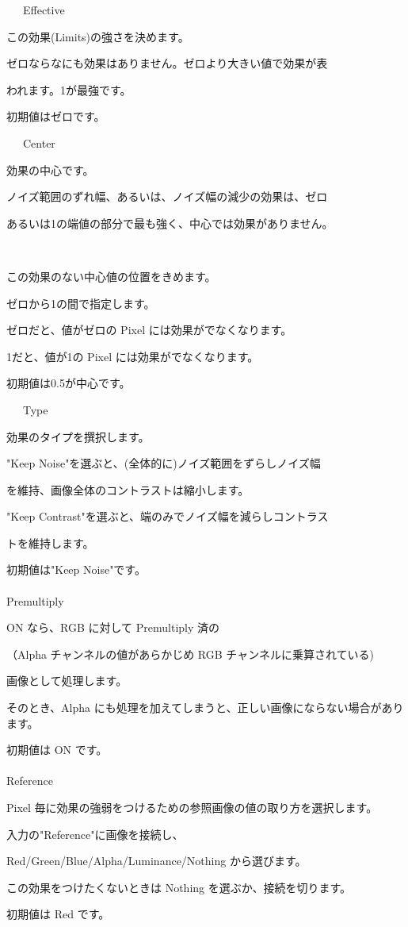 \documentclass[a4paper,12pt]{article}
\begin{document}
\par
\noindent \ \ \, Effective\par
この効果(Limits)の強さを決めます。\par
ゼロならなにも効果はありません。ゼロより大きい値で効果が表\par
われます。1が最強です。\par
初期値はゼロです。\\
\par
\noindent \ \ \, Center\par
効果の中心です。\par
ノイズ範囲のずれ幅、あるいは、ノイズ幅の減少の効果は、ゼロ\par
あるいは1の端値の部分で最も強く、中心では効果がありません。

\newpage

\thispagestyle{empty}

\ \vspace{-0.2em}
\par
この効果のない中心値の位置をきめます。\par
ゼロから1の間で指定します。\par
ゼロだと、値がゼロの Pixel には効果がでなくなります。\par
1だと、値が1の Pixel には効果がでなくなります。\par
初期値は0.5が中心です。\\
\par
\noindent \ \ \, Type\par
効果のタイプを撰択します。\par
"Keep Noise"を選ぶと、(全体的に)ノイズ範囲をずらしノイズ幅\par
を維持、画像全体のコントラストは縮小します。\par
"Keep Contrast"を選ぶと、端のみでノイズ幅を減らしコントラス\par
トを維持します。\par
初期値は"Keep Noise"です。\\
\\
Premultiply\par
ON なら、RGB に対して Premultiply 済の\par
（Alpha チャンネルの値があらかじめ RGB チャンネルに乗算されている)\par
画像として処理します。\par
そのとき、Alpha にも処理を加えてしまうと、正しい画像にならない場合があります。\par
初期値は ON です。\\
\\
Reference\par
Pixel 毎に効果の強弱をつけるための参照画像の値の取り方を選択します。\par
入力の"Reference"に画像を接続し、\par
Red/Green/Blue/Alpha/Luminance/Nothing から選びます。\par
この効果をつけたくないときは Nothing を選ぶか、接続を切ります。\par
初期値は Red です。
\end{document}
